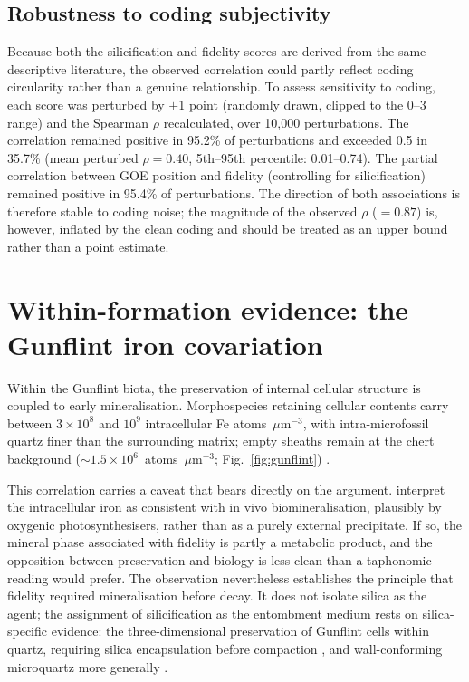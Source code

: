 \documentclass[11pt]{article}
\begin{document}
\subsection{Robustness to coding subjectivity}

Because both the silicification and fidelity scores are derived from the same descriptive
literature, the observed correlation could partly reflect coding circularity rather than a genuine
relationship. To assess sensitivity to coding, each score was perturbed by $\pm$1 point (randomly
drawn, clipped to the 0--3 range) and the Spearman $\rho$ recalculated, over 10{,}000 perturbations.
The correlation remained positive in 95.2\% of perturbations and exceeded 0.5 in 35.7\% (mean
perturbed $\rho = 0.40$, 5th--95th percentile: 0.01--0.74). The partial correlation between GOE
position and fidelity (controlling for silicification) remained positive in 95.4\% of perturbations.
The direction of both associations is therefore stable to coding noise; the magnitude of the observed
$\rho$ ($= 0.87$) is, however, inflated by the clean coding and should be treated as an upper bound
rather than a point estimate.

\section{Within-formation evidence: the Gunflint iron covariation}

Within the Gunflint biota, the preservation of internal cellular structure is coupled to early
mineralisation. Morphospecies retaining cellular contents carry between $3\times10^{8}$ and
$10^{9}$ intracellular Fe atoms~$\mu$m$^{-3}$, with intra-microfossil quartz finer than the
surrounding matrix; empty sheaths remain at the chert background
($\sim$$1.5\times10^{6}$~atoms~$\mu$m$^{-3}$; Fig.~\ref{fig:gunflint}) \citep{Lepot2017a}.

This correlation carries a caveat that bears directly on the argument. \citet{Lepot2017a} interpret
the intracellular iron as consistent with in vivo biomineralisation, plausibly by oxygenic
photosynthesisers, rather than as a purely external precipitate. If so, the mineral phase associated
with fidelity is partly a metabolic product, and the opposition between preservation and biology is
less clean than a taphonomic reading would prefer. The observation nevertheless establishes the
principle that fidelity required mineralisation before decay. It does not isolate silica as the
agent; the assignment of silicification as the entombment medium rests on silica-specific evidence:
the three-dimensional preservation of Gunflint cells within quartz, requiring silica encapsulation
before compaction \citep{Lepot2017a,Alleon2016a}, and wall-conforming microquartz more generally
\citep{Wacey2012}.
\end{document}
